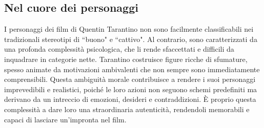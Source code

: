 \documentclass[12pt]{article} %
\begin{document}
\begin{flushleft}
    
\end{flushleft}
\break

\subsection{Nel cuore dei personaggi}
\begin{flushleft}
    I personaggi dei film di Quentin Tarantino non sono facilmente classificabili nei tradizionali stereotipi di ``buono" e ``cattivo". Al contrario, sono caratterizzati da una profonda complessità psicologica, che li rende sfaccettati e difficili da inquadrare in categorie nette. Tarantino costruisce figure ricche di sfumature, spesso animate da motivazioni ambivalenti che non sempre sono immediatamente comprensibili. Questa ambiguità morale contribuisce a rendere i suoi personaggi imprevedibili e realistici, poiché le loro azioni non seguono schemi predefiniti ma derivano da un intreccio di emozioni, desideri e contraddizioni. È proprio questa complessità a dare loro una straordinaria autenticità, rendendoli memorabili e capaci di lasciare un’impronta nel film.

\end{flushleft}
\end{document}
